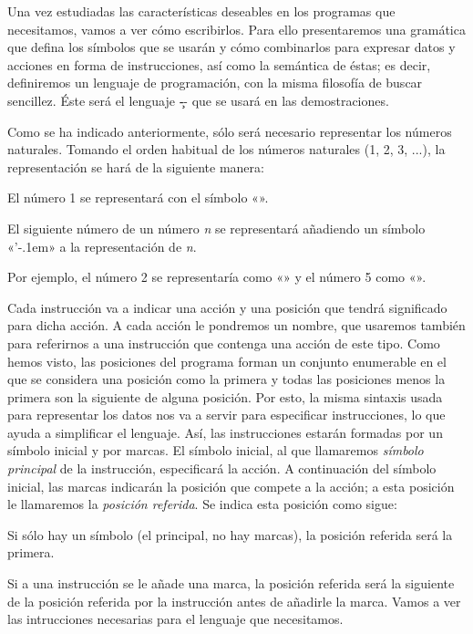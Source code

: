 Una vez estudiadas las características deseables en los programas que necesitamos, vamos a ver cómo
escribirlos. Para ello presentaremos una gramática que defina los símbolos que se usarán y cómo
combinarlos para expresar datos y acciones en forma de instrucciones, así como la semántica de
éstas; es decir, definiremos un lenguaje de programación, con la misma filosofía de buscar
sencillez. Éste será el lenguaje \c-- que se usará en las demostraciones.

Como se ha indicado anteriormente, sólo será necesario representar los números
naturales. Tomando el orden habitual de los números naturales (1, 2, 3, ...), la representación
se hará de la siguiente manera:

\listanormal
El número 1 se representará con el símbolo «{}».

El siguiente número de un número {\it n} se representará añadiendo un símbolo «{\fcomilla’\kern-.1em}» a la
representación de {\it n}.

\finlista
Por ejemplo, el número 2 se representaría como «» y el número 5 como «».

Cada instrucción va a indicar una acción y una posición que tendrá significado para dicha acción. A
cada acción le pondremos un nombre, que usaremos también para referirnos a una instrucción que
contenga una acción de este tipo. Como hemos visto, las posiciones del programa forman un conjunto
enumerable en el que se considera una posición como la primera y todas las posiciones menos la
primera son la siguiente de alguna posición. Por esto, la misma sintaxis usada para representar los
datos nos va a servir para especificar instrucciones, lo que ayuda a simplificar el lenguaje. Así,
las instrucciones estarán formadas por un símbolo inicial y por marcas.  El símbolo inicial, al que
llamaremos {\it símbolo principal} de la instrucción, especificará la acción. A continuación del
símbolo inicial, las marcas indicarán la posición que compete a la acción; a esta posición le
llamaremos la {\it posición referida}. Se indica esta posición como sigue:

\listanormal
Si sólo hay un símbolo (el principal, no hay marcas), la posición referida será la primera.

Si a una instrucción se le añade una marca, la posición referida será la siguiente de la posición
referida por la instrucción antes de añadirle la marca.
\finlista
Vamos a ver las intrucciones necesarias para el lenguaje que necesitamos.

